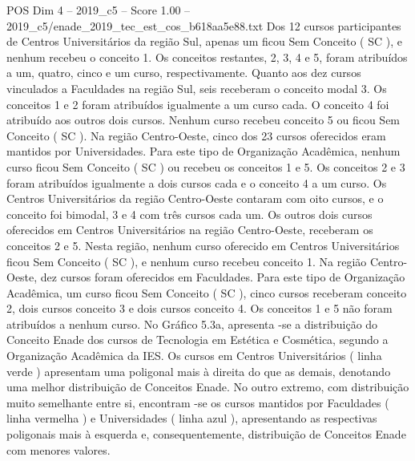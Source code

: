 \begin{textsample}{POS Dim 4 – 2019\_c5 – Score 1.00 – 2019\_c5/enade\_2019\_tec\_est\_cos\_b618aa5e88.txt}
Dos 12 cursos participantes de Centros Universitários da região Sul, apenas um ficou Sem Conceito ( SC ), e nenhum recebeu o conceito 1.
Os conceitos restantes, 2, 3, 4 e 5, foram atribuídos a um, quatro, cinco e um curso, respectivamente.
Quanto aos dez cursos vinculados a Faculdades na região Sul, seis receberam o conceito modal 3.
Os conceitos 1 e 2 foram atribuídos igualmente a um curso cada.
O conceito 4 foi atribuído aos outros dois cursos.
Nenhum curso recebeu conceito 5 ou ficou Sem Conceito ( SC ).
Na região Centro-Oeste, cinco dos 23 cursos oferecidos eram mantidos por Universidades.
Para este tipo de Organização Acadêmica, nenhum curso ficou Sem Conceito ( SC ) ou recebeu os conceitos 1 e 5.
Os conceitos 2 e 3 foram atribuídos igualmente a dois cursos cada e o conceito 4 a um curso.
Os Centros Universitários da região Centro-Oeste contaram com oito cursos, e o conceito foi bimodal, 3 e 4 com três cursos cada um.
Os outros dois cursos oferecidos em Centros Universitários na região Centro-Oeste, receberam os conceitos 2 e 5.
Nesta região, nenhum curso oferecido em Centros Universitários ficou Sem Conceito ( SC ), e nenhum curso recebeu conceito 1.
Na região Centro-Oeste, dez cursos foram oferecidos em Faculdades.
Para este tipo de Organização Acadêmica, um curso ficou Sem Conceito ( SC ), cinco cursos receberam conceito 2, dois cursos conceito 3 e dois cursos conceito 4.
Os conceitos 1 e 5 não foram atribuídos a nenhum curso.
No Gráfico 5.3a, apresenta -se a distribuição do Conceito Enade dos cursos de Tecnologia em Estética e Cosmética, segundo a Organização Acadêmica da IES.
Os cursos em Centros Universitários ( linha verde ) apresentam uma poligonal mais à direita do que as demais, denotando uma melhor distribuição de Conceitos Enade.
No outro extremo, com distribuição muito semelhante entre si, encontram -se os cursos mantidos por Faculdades ( linha vermelha ) e Universidades ( linha azul ), apresentando as respectivas poligonais mais à esquerda e, consequentemente, distribuição de Conceitos Enade com menores valores.

\end{textsample}

